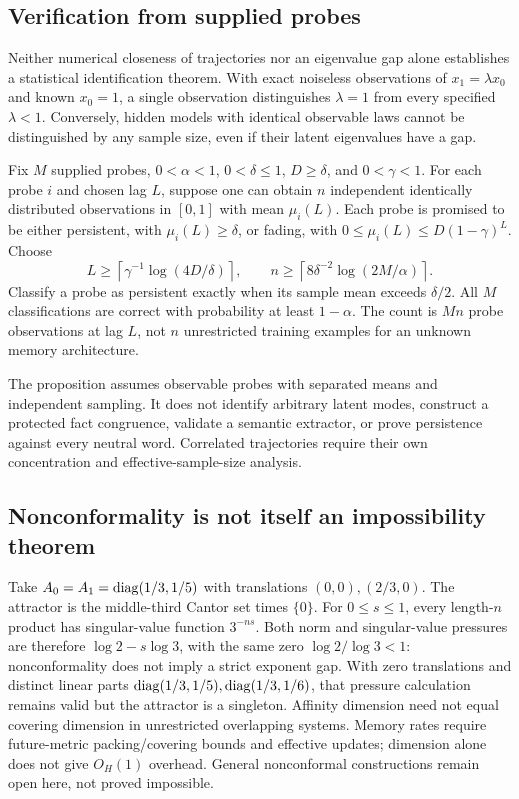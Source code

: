 \subsection{Verification from supplied probes}
Neither numerical closeness of trajectories nor an eigenvalue gap alone
establishes a statistical identification theorem. With exact noiseless
observations of $x_1=\lambda x_0$ and known $x_0=1$, a single observation
distinguishes $\lambda=1$ from every specified $\lambda<1$. Conversely,
hidden models with identical observable laws cannot be distinguished by
any sample size, even if their latent eigenvalues have a gap.

\begin{proposition}
\label{III:M:prop:probe-test}
Fix $M$ supplied probes, $0<\alpha<1$, $0<\delta\le1$, $D\ge\delta$,
and $0<\gamma<1$. For each probe $i$ and chosen lag $L$, suppose one can
obtain $n$ independent identically distributed observations in $[0,1]$
with mean $\mu_i(L)$. Each probe is promised to be either persistent,
with $\mu_i(L)\ge\delta$, or fading, with
$0\le\mu_i(L)\le D(1-\gamma)^L$. Choose
\[
 L\ge\left\lceil\gamma^{-1}\log(4D/\delta)\right\rceil,
 \qquad
 n\ge\left\lceil8\delta^{-2}\log(2M/\alpha)\right\rceil.
\]
Classify a probe as persistent exactly when its sample mean exceeds
$\delta/2$. All $M$ classifications are correct with probability at
least $1-\alpha$. The count is $Mn$ probe observations at lag $L$,
not $n$ unrestricted training examples for an unknown memory architecture.
\end{proposition}

The proposition assumes observable probes with separated means and
independent sampling. It does not identify arbitrary latent modes,
construct a protected fact congruence, validate a semantic extractor, or
prove persistence against every neutral word. Correlated trajectories
require their own concentration and effective-sample-size analysis.

\subsection{Nonconformality is not itself an impossibility theorem}
Take $A_0=A_1=\operatorname{diag}(1/3,1/5)$ with translations $(0,0),(2/3,0)$.
The attractor is the middle-third Cantor set times $\{0\}$.
For $0\le s\le1$, every length-$n$ product has singular-value function
$3^{-ns}$. Both norm and singular-value pressures are therefore
$\log2-s\log3$, with the same zero $\log2/\log3<1$:
nonconformality does not imply a strict exponent gap.
With zero translations and distinct linear parts
$\operatorname{diag}(1/3,1/5),\operatorname{diag}(1/3,1/6)$, that pressure calculation remains valid
but the attractor is a singleton. Affinity dimension need not equal
covering dimension in unrestricted overlapping systems.
Memory rates require future-metric packing/covering bounds and effective
updates; dimension alone does not give $O_H(1)$ overhead. General
nonconformal constructions remain open here, not proved impossible.

